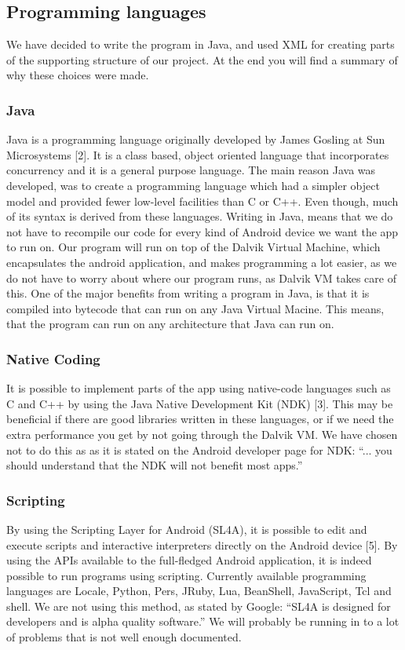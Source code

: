 
\subsection{Programming languages}
We have decided to write the program in Java, and used XML for creating parts of the supporting structure of our project. At the end you will find a summary of why these choices were made.

\subsubsection{Java}
Java is a programming language originally developed by James Gosling at Sun Microsystems [2]. It is a class based, object oriented language that incorporates concurrency and it is a general purpose language. The main reason Java was developed, was to create a programming language which had a simpler object model and provided fewer low-level facilities than C or C++. Even though, much of its syntax is derived from these languages.
\newline
\newline
Writing in Java, means that we do not have to recompile our code for every kind of Android device we want the app to run on. Our program will run on top of the Dalvik Virtual Machine, which encapsulates the android application, and makes programming a lot easier, as we do not have to worry about where our program runs, as Dalvik VM takes care of this.
\newline
\newline
One of the major benefits from writing a program in Java, is that it is compiled into bytecode that can run on any Java Virtual Macine. This means, that the program can run on any architecture that Java can run on.

\subsubsection{Native Coding}
It is possible to implement parts of the app using native-code languages such as C and C++ by using the Java Native Development Kit (NDK) [3]. This may be beneficial if there are good libraries written in these languages, or if we need the extra performance you get by not going through the Dalvik VM. We have chosen not to do this as as it is stated on the Android developer page for NDK: “... you should understand that the NDK will not benefit most apps.”

\subsubsection{Scripting}
By using the Scripting Layer for Android (SL4A), it is possible to edit and execute scripts and interactive interpreters directly on the Android device [5]. By using the APIs available to the full-fledged Android application, it is indeed possible to run programs using scripting. Currently available programming languages are Locale, Python, Pers, JRuby, Lua, BeanShell, JavaScript, Tcl and shell. We are not using this method, as stated by Google: “SL4A is designed for developers and is alpha quality software.” We will probably be running in to a lot of problems that is not well enough documented.

